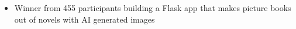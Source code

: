 \begin{itemize}
    \item Winner from 455 participants building a Flask app that makes picture books out of novels with AI generated images
\end{itemize}